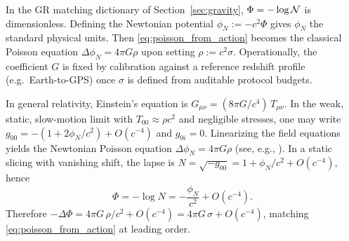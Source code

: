 \begin{remark}
\label{rem:units_calibration}
In the GR matching dictionary of Section~\ref{sec:gravity}, $\Phi=-\log\mathcal{N}$ is dimensionless.
Defining the Newtonian potential $\phi_N:=-c^2\Phi$ gives $\phi_N$ the standard physical units.
Then \eqref{eq:poisson_from_action} becomes the classical Poisson equation $\Delta\phi_N=4\pi G\rho$ upon setting $\rho:=c^2\sigma$.
Operationally, the coefficient $G$ is fixed by calibration against a reference redshift profile (e.g.\ Earth-to-GPS) once $\sigma$ is defined from auditable protocol budgets.
\end{remark}

\begin{remark}
\label{rem:weak_field_gr_poisson}
In general relativity, Einstein's equation is $G_{\mu\nu}=(8\pi G/c^4)\,T_{\mu\nu}$.
In the weak, static, slow-motion limit with $T_{00}\approx \rho c^2$ and negligible stresses, one may write
$g_{00}=-(1+2\phi_N/c^2)+O(c^{-4})$ and $g_{0i}=0$.
Linearizing the field equations yields the Newtonian Poisson equation $\Delta\phi_N=4\pi G\rho$ (see, e.g., \cite{MisnerThorneWheeler1973,Wald1984,Carroll2004,Poisson2004}).
In a static slicing with vanishing shift, the lapse is $N=\sqrt{-g_{00}}=1+\phi_N/c^2+O(c^{-4})$, hence
\[
\Phi=-\log N=-\frac{\phi_N}{c^2}+O(c^{-4}).
\]
Therefore $-\Delta\Phi=4\pi G\,\rho/c^2+O(c^{-4})=4\pi G\,\sigma+O(c^{-4})$, matching \eqref{eq:poisson_from_action} at leading order.
\end{remark}


